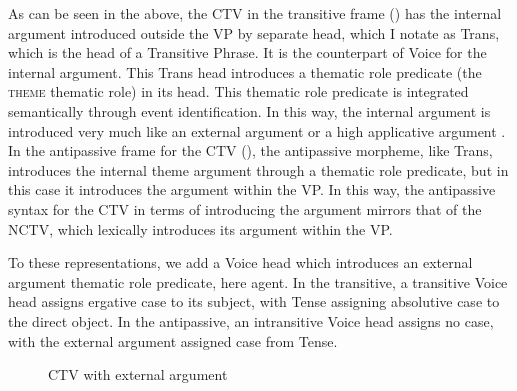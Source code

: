 \documentclass[output=paper,colorlinks,citecolor=brown,modfonts,nonflat]{langsci/langscibook}
\begin{document}
As can be seen in the above, the CTV in the transitive frame () has the internal argument introduced outside the VP by separate head, which I notate as Trans, which is the head of a Transitive Phrase. It is the counterpart of Voice for the internal argument. This Trans head introduces a thematic role predicate (the \textsc{theme} thematic role) in its head. This thematic role predicate is integrated semantically through event identification. In this way, the internal argument is introduced very much like an external argument or a high applicative argument \citep{JohnsKucerova2017}. In the antipassive frame for the CTV (), the antipassive morpheme, like Trans, introduces the internal theme argument through a thematic role predicate, but in this case it introduces the argument within the VP. In this way, the antipassive syntax for the CTV in terms of introducing the argument mirrors that of the NCTV, which lexically introduces its argument within the VP.

To these representations, we add a Voice head which introduces an external argument thematic role predicate, here agent. In the transitive, a transitive Voice head assigns ergative case to its subject, with Tense assigning absolutive case to the direct object. In the antipassive, an intransitive Voice head assigns no case, with the external argument assigned case from Tense.

\begin{figure}
	\caption{\label{fig:basilico:6} CTV with external argument}
\end{figure}
\end{document}
